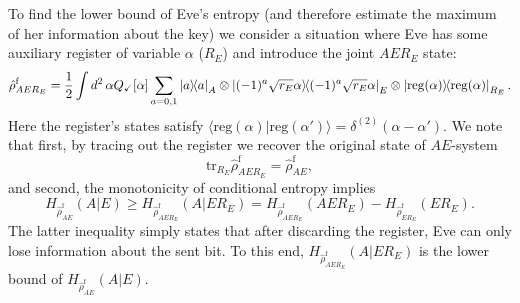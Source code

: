 \documentclass[a4paper]{article}
\newcommand{\prjct}[1]{\mathinner{|{#1}\rangle}\!\!\mathinner{\langle{#1}|}}
\newcommand{\tr}{\text{tr}}
\renewcommand{\t}[1]{\mathrm{#1}}
\newcommand{\be}{\begin{equation}}
\newcommand{\ee}{\end{equation}}
\begin{document}
To find the lower bound of Eve's entropy (and therefore estimate the maximum of her information about the key) we consider a situation where Eve has some auxiliary register of variable $\alpha$ ($R_E$) and introduce the joint $AER_E$ state:
\be
\hat{\rho}^\text{f}_{AER_E} = \frac{1}{2} \int d^2\, \alpha Q_\checkmark[\alpha] \sum_{a=0,1} \prjct{a}_A\otimes \prjct{(-1)^a\sqrt{r_E}\alpha}_E\otimes \prjct{\t{reg}(\alpha) }_{R_E}.
\ee
Here the register's states satisfy $\langle\t{reg}(\alpha)|\t{reg}(\alpha')\rangle=\delta^{(2)}(\alpha-\alpha')$. 
We note that first, by tracing out the register we recover the original state of $AE$-system
\be
\tr_{R_E} \hat{\rho}^\text{f}_{AER_E} = \hat{\rho}^\text{f}_{AE},
\ee
and second, the monotonicity of conditional entropy implies
\be
H_{\hat{\rho}^\text{f}_{AE}}(A|E)\geq H_{\hat{\rho}^\text{f}_{AER_E}}(A|E R_E)= H_{\hat{\rho}^\text{f}_{AER_E}}(AER_E) - H_{\hat{\rho}^\text{f}_{ER_E}}(ER_E).
\ee
The latter inequality simply states that after discarding the register, Eve can only lose information about the sent bit. 
To this end, $H_{\hat{\rho}^\text{f}_{AER_E}}(A|E R_E)$ is the lower bound of $H_{\hat{\rho}^\text{f}_{AE}}(A|E)$.
\end{document}
